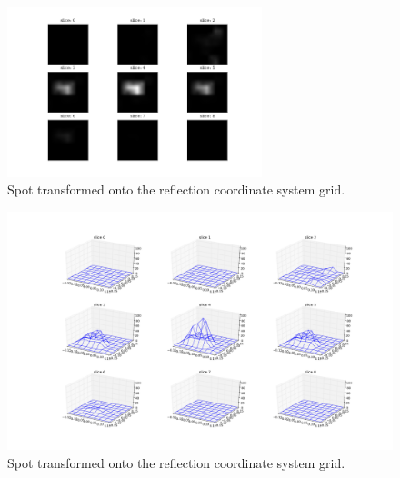 \documentclass[a4paper,10pt]{article}
\begin{document}
\begin{figure}
  \centering
  \includegraphics[width=0.66\textwidth]{./Figures/transformed_spot_slices.png}
  \caption{Spot transformed onto the reflection coordinate system grid.}
  \label{figure: transformed spot}
\end{figure}

\begin{figure}
  \centering
  \includegraphics[width=1.00\textwidth]{./Figures/transformed_spot_wireframe.png}
  \caption{Spot transformed onto the reflection coordinate system grid.}
  \label{figure: transformed spot wireframe}
\end{figure}
\end{document}

